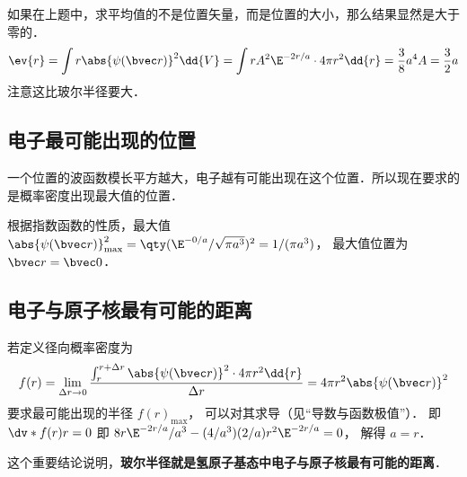 如果在上题中，求平均值的不是位置矢量，而是位置的大小，那么结果显然是大于零的．
\begin{equation}
\ev{r} = \int r \abs{\psi (\bvec r)}^2 \dd{V} = \int r A^2 \E^{-2r/a} \cdot 4\pi r^2 \dd{r} = \frac{3}{8} a^4 A = \frac{3}{2}a
\end{equation}
注意这比玻尔半径要大．

\subsection{电子最可能出现的位置}

 一个位置的波函数模长平方越大，电子越有可能出现在这个位置．所以现在要求的是概率密度出现最大值的位置．
 
根据指数函数的性质，最大值 $\abs{\psi (\bvec r)}_{\max}^2 = \qty( \E^{-0/a}/\sqrt{\pi a^3})^2 = 1/(\pi a^3)$， 最大值位置为 $\bvec r = \bvec 0$．

\subsection{电子与原子核最有可能的距离}
若定义径向概率密度为
\begin{equation}
f(r) = \lim_{\Delta r \to 0} \frac{\int_r^{r + \Delta r} {\abs{\psi (\bvec r)}}^2 \cdot 4\pi r^2 \dd{r} }{\Delta r} = 4\pi r^2 \abs{\psi(\bvec r)}^2
\end{equation}
要求最可能出现的半径 $f(r)_{\max}$， 可以对其求导（见“导数与函数极值”）． 即 $\dv*{f(r)}{r} = 0$ 即 $8 r \E^{-2r/a}/a^3 - (4/a^3)(2/a)r^2 \E^{-2r/a} = 0$， 解得 $a = r$． 
 
这个重要结论说明，\textbf{玻尔半径就是氢原子基态中电子与原子核最有可能的距离}．
